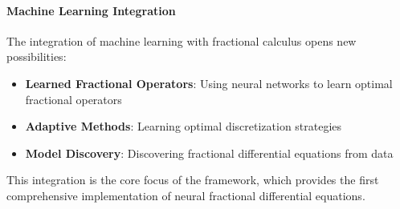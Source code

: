 \paragraph{Machine Learning Integration}

The integration of machine learning with fractional calculus opens new possibilities:

\begin{itemize}
    \item \textbf{Learned Fractional Operators}: Using neural networks to learn optimal fractional operators
    \item \textbf{Adaptive Methods}: Learning optimal discretization strategies
    \item \textbf{Model Discovery}: Discovering fractional differential equations from data
\end{itemize}

This integration is the core focus of the \hpfracc framework, which provides the first comprehensive implementation of neural fractional differential equations.
